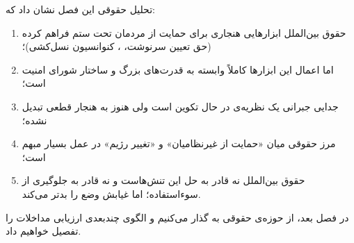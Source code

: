 تحلیل حقوقی این فصل نشان داد که:
\begin{enumerate}[label=\textbf{\arabic*.}, nosep, rightmargin=1em]
	\item حقوق بین‌الملل ابزارهایی هنجاری برای حمایت از مردمان
	تحت ستم فراهم کرده (حق تعیین سرنوشت، ، کنوانسیون
	نسل‌کشی)؛
	\item اما اعمال این ابزارها کاملاً وابسته به  قدرت‌های بزرگ و ساختار شورای امنیت است؛
	\item جدایی جبرانی یک نظریه‌ی در حال تکوین است ولی هنوز به
	هنجار قطعی تبدیل نشده؛
	\item مرز حقوقی میان «حمایت از غیرنظامیان» و «تغییر رژیم»
	در عمل بسیار مبهم است؛
	\item حقوق بین‌الملل نه قادر به حل این تنش‌هاست و نه قادر
	به جلوگیری از سوءاستفاده؛ اما غیابش وضع را بدتر می‌کند.
\end{enumerate}

در فصل بعد، از حوزه‌ی حقوقی به 
گذار می‌کنیم و الگوی چندبعدی ارزیابی مداخلات را تفصیل خواهیم داد.